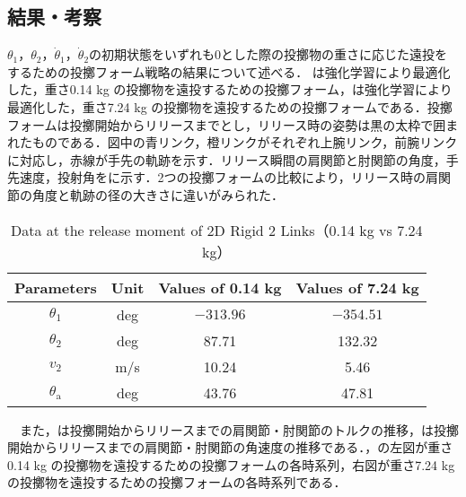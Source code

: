\subsection{結果・考察}
$\theta_{1}$，$\theta_{2}$，$\dot{\theta}_{1}$，$\dot{\theta}_{2}$の初期状態をいずれも0とした際の投擲物の重さに応じた遠投をするための投擲フォーム戦略の結果について述べる．
は強化学習により最適化した，重さ0.14 kg の投擲物を遠投するための投擲フォーム，は強化学習により最適化した，重さ7.24 kg の投擲物を遠投するための投擲フォームである．投擲フォームは投擲開始からリリースまでとし，リリース時の姿勢は黒の太枠で囲まれたものである．図中の青リンク，橙リンクがそれぞれ上腕リンク，前腕リンクに対応し，赤線が手先の軌跡を示す．リリース瞬間の肩関節と肘関節の角度，手先速度，投射角をに示す．2つの投擲フォームの比較により，リリース時の肩関節の角度と軌跡の径の大きさに違いがみられた．\\
\begin{table}[tb]
  \begin{center}
    \caption{Data at the release moment of 2D Rigid 2 Links（0.14 kg vs 7.24 kg）}
    \begin{tabular}{c|c|c|c}
      \hline
      Parameters & Unit & Values of 0.14 kg & Values of 7.24 kg \\
      \hline
      $\theta_{1}$ & deg & $-313.96$ & $-354.51$ \\
      $\theta_{2}$ & deg & 87.71 & 132.32 \\
      $v_{2}$ & m/s & 10.24 & 5.46 \\
      $\theta_{\mathrm{a}}$ & deg & 43.76 & 47.81 \\
      \hline
    \end{tabular}
  \end{center}
\end{table}
　また，は投擲開始からリリースまでの肩関節・肘関節のトルクの推移，は投擲開始からリリースまでの肩関節・肘関節の角速度の推移である．，の左図が重さ0.14 kg の投擲物を遠投するための投擲フォームの各時系列，右図が重さ7.24 kg の投擲物を遠投するための投擲フォームの各時系列である．\\
